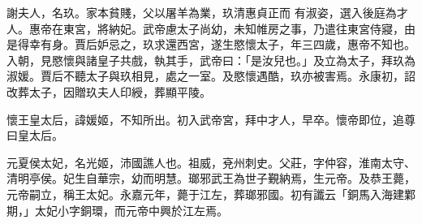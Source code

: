 \begin{pinyinscope}
 謝夫人，名玖。家本貧賤，父以屠羊為業，玖清惠貞正而
 有淑姿，選入後庭為才人。惠帝在東宮，將納妃。武帝慮太子尚幼，未知帷房之事，乃遣往東宮侍寢，由是得幸有身。賈后妒忌之，玖求還西宮，遂生愍懷太子，年三四歲，惠帝不知也。入朝，見愍懷與諸皇子共戲，執其手，武帝曰：「是汝兒也。」及立為太子，拜玖為淑媛。賈后不聽太子與玖相見，處之一室。及愍懷遇酷，玖亦被害焉。永康初，詔改葬太子，因贈玖夫人印綬，葬顯平陵。



 懷王皇太后，諱媛姬，不知所出。初入武帝宮，拜中才人，早卒。懷帝即位，追尊曰皇太后。



 元夏侯太妃，名光姬，沛國譙人也。祖威，兗州刺史。父莊，字仲容，淮南太守、清明亭侯。妃生自華宗，幼而明慧。瑯邪武王為世子覲納焉，生元帝。及恭王薨，元帝嗣立，稱王太妃。永嘉元年，薨于江左，葬瑯邪國。初有讖云「銅馬入海建鄴期，」太妃小字銅環，而元帝中興於江左焉。



\end{pinyinscope}